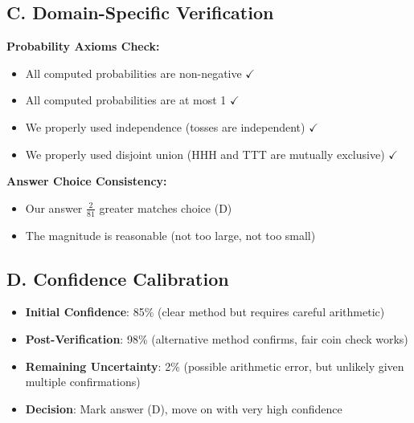 \documentclass[]{article}
\begin{document}
\begin{verificationbox}
\subsection*{C. Domain-Specific Verification}

\textbf{Probability Axioms Check:}
\begin{itemize}[leftmargin=*]
    \item All computed probabilities are non-negative $\checkmark$
    \item All computed probabilities are at most 1 $\checkmark$
    \item We properly used independence (tosses are independent) $\checkmark$
    \item We properly used disjoint union (HHH and TTT are mutually exclusive) $\checkmark$
\end{itemize}

\textbf{Answer Choice Consistency:}
\begin{itemize}[leftmargin=*]
    \item Our answer $\frac{2}{81}$ greater matches choice (D)
    \item The magnitude is reasonable (not too large, not too small)
\end{itemize}

\subsection*{D. Confidence Calibration}
\begin{itemize}[leftmargin=*]
    \item \textbf{Initial Confidence}: 85\% (clear method but requires careful arithmetic)
    \item \textbf{Post-Verification}: 98\% (alternative method confirms, fair coin check works)
    \item \textbf{Remaining Uncertainty}: 2\% (possible arithmetic error, but unlikely given multiple confirmations)
    \item \textbf{Decision}: Mark answer (D), move on with very high confidence
\end{itemize}
\end{verificationbox}
\end{document}
